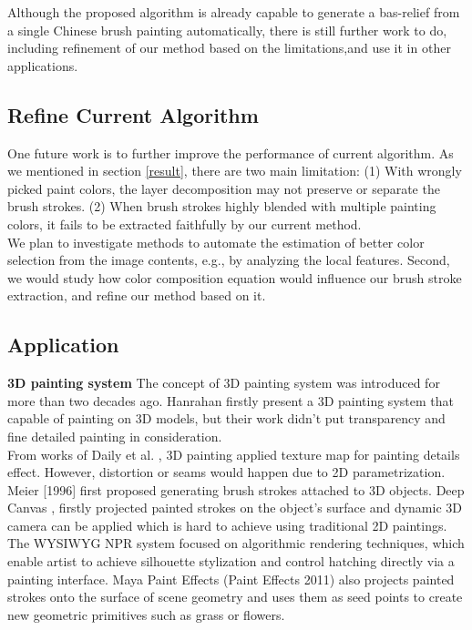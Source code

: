 Although the proposed algorithm is already capable to generate a bas-relief from a single Chinese brush painting automatically, there is still further work to do, including refinement of our method based on the limitations,and use it in other applications.

\subsection{Refine Current Algorithm}
One future work is to further improve the performance of current algorithm. As we mentioned in section \ref{result}, there are two main limitation: (1) With wrongly picked paint colors, the layer decomposition may not preserve or separate the brush strokes. (2) When brush strokes highly blended with  multiple painting colors, it fails to be extracted faithfully by our current method. \\
We plan to investigate methods to automate the estimation of better color selection from the image contents, e.g., by analyzing the local features. Second, we would study how color composition equation would influence our brush stroke extraction, and refine our method based on it.  

\subsection{Application  }
\textbf{3D painting system}\newline
The concept of 3D painting system was introduced for more than two decades ago.  Hanrahan \cite{hanrahan1990direct} firstly present a 3D painting system that capable of painting on 3D models, but their work didn’t put transparency and fine detailed painting in consideration. \\
From works of  Daily et al. \cite{daily19953d}, 3D painting applied texture map for painting details effect. However, distortion or seams would happen due to 2D parametrization. Meier [1996] first proposed generating brush strokes attached to 3D objects.  Deep Canvas \cite{katanics2003deep}, firstly projected painted strokes on the object’s surface and dynamic 3D camera can be applied which is hard to achieve using traditional 2D paintings. The WYSIWYG NPR system \cite{kalnins2002wysiwyg} focused on algorithmic rendering techniques, which enable artist to achieve silhouette stylization and control hatching directly via a painting interface. Maya Paint Effects (Paint Effects 2011) also projects painted strokes onto the surface of scene geometry and uses them as seed points to create new geometric primitives such as grass or flowers.

